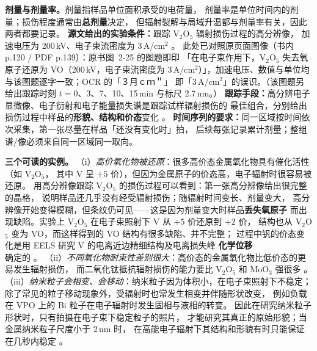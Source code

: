 \begin{measure}
\textbf{剂量与剂量率。}剂量指样品单位面积承受的电荷量，
剂量率是单位时间内的剂量；损伤程度通常由\textbf{总剂量}决定，
但辐射裂解与局域升温都与剂量率有关，因此两者都要记录。
\textbf{源文给出的实验条件：}跟踪 V$_2$O$_5$ 辐射损伤过程的高分辨像，
加速电压为 200\,kV、电子束流密度为 3\,A/cm$^2$
。
此处已对照原页面图像（书内 p.120 / PDF p.139）：原书图~2-25 的图题即印
「在电子束作用下，V$_2$O$_5$ 失去氧原子还原为 VO（200\,kV，电子束流密度为
3\,A/cm$^2$）」，加速电压、数值与单位均与该图题逐字一致；OCR 的「３月ｃｍ＂」
即「3\,A/cm$^2$」的误识。（该图题另给出跟踪时刻 $t=0$、3、7、10、15\,min
与标尺 2.7\,nm。）
\textbf{跟踪手段：}高分辨电子显微像、电子衍射和电子能量损失谱是跟踪试样辐射损伤的
最佳组合，分别给出损伤过程中样品的\textbf{形貌、结构和价态}变化
。
\textbf{时间序列的要求：}同一区域按时间依次采集，第一张尽量在样品「还没有变化时」拍，
后续每张记录累计剂量；整组谱/像必须来自同一区域同一取向。
\end{measure}

\begin{principle}
\textbf{三个可读的实例。}
（i）\emph{高价氧化物被还原}：很多高价态金属氧化物具有催化活性（如 V$_2$O$_5$，
其中 V 呈 $+5$ 价），但因为金属原子的价态高，电子辐射时很容易被还原。
用高分辨像跟踪 V$_2$O$_5$ 的损伤过程可以看到：第一张高分辨像给出很完整的晶格，
说明样品还几乎没有经受辐射损伤；随辐射时间变长、剂量变大，
高分辨像开始变得模糊，但条纹仍可见——这是因为剂量变大时样品\textbf{丢失氧原子}
而出现缺陷。实验上 V$_2$O$_5$ 在电子束照射下 V 从 $+5$ 价还原到 $+2$ 价，
结构也从 V$_2$O$_5$ 变为 VO，而这样得到的 VO 结构有很多缺陷、并不完整；
过程中钒的价态变化是用 EELS 研究 V 的电离近边精细结构及电离损失峰
\textbf{化学位移}确定的
。
（ii）\emph{不同氧化物耐束性差别很大}：高价态的金属氧化物比低价态的更易发生辐射损伤，
而二氧化钛抵抗辐射损伤的能力要比 V$_2$O$_5$ 和 MoO$_3$ 强很多
。
（iii）\emph{纳米粒子会相变、会移动}：纳米粒子因为体积小，在电子束照射下不稳定；
除了常见的粒子移动现象外，受辐射时也常发生相变并伴随形状改变，
例如负载在 VPO 上的 Bi 粒子在电子辐射时发生固相与液相的转变。
因此在研究纳米粒子形状时，只有拍摄在电子束下稳定粒子的照片，
才能研究其真正的原始形貌；当金属纳米粒子尺度小于 2\,nm 时，
在高能电子辐射下其结构和形貌有时只能保证在几秒内稳定
。
\end{principle}

